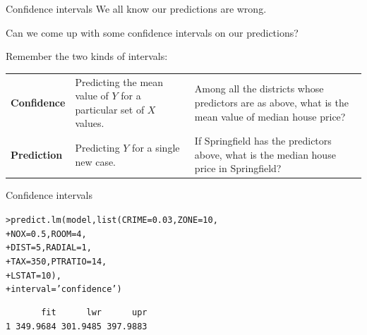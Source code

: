 \documentclass{beamer}\usepackage[]{graphicx}\usepackage[]{color}
\makeatletter
\newcommand{\hlnum}[1]{\textcolor[rgb]{0.824,0.412,0.118}{#1}}%
\newcommand{\hlstr}[1]{\textcolor[rgb]{1,0.894,0.71}{#1}}%
\newcommand{\hlstd}[1]{\textcolor[rgb]{1,0.894,0.769}{#1}}%
\newcommand{\hlkwc}[1]{\textcolor[rgb]{0.78,0.941,0.545}{#1}}%
\newcommand{\hlkwd}[1]{\textcolor[rgb]{1,0.78,0.769}{#1}}%
\newenvironment{kframe}{%
 \def\at@end@of@kframe{}%
 \ifinner\ifhmode%
  \def\at@end@of@kframe{\end{minipage}}%
  \begin{minipage}{\columnwidth}%
 \fi\fi%
 \def\FrameCommand##1{\hskip\@totalleftmargin \hskip-\fboxsep
 \colorbox{shadecolor}{##1}\hskip-\fboxsep
     \hskip-\linewidth \hskip-\@totalleftmargin \hskip\columnwidth}%
 \MakeFramed {\advance\hsize-\width
   \@totalleftmargin\z@ \linewidth\hsize
   \@setminipage}}%
 {\par\unskip\endMakeFramed%
 \at@end@of@kframe}
\newenvironment{knitrout}{}{} %
\makeatother
\begin{document}
\begin{darkframes}
    
    
    \begin{frame}[fragile]{Confidence intervals}
    \fontsize{9}{9}\selectfont
      We all know our predictions are wrong. 
      
      Can we come up with some confidence intervals on our predictions? \pause
      \bigskip
      
      Remember the two kinds of intervals:
      \bigskip

      \begin{tabular}{lp{1in}p{2in}}
        \textbf{Confidence} & Predicting the mean value of $Y$ for a particular  set of $X$ values. & Among all the districts whose predictors are as above, what is the mean value of median house price?  \\
        \textbf{Prediction} & Predicting $Y$ for a single new case. & If Springfield has the predictors above, what is the median house price in Springfield?\\
      \end{tabular}
    
    
    \end{frame}
        
      
    
    \begin{frame}[fragile]{Confidence intervals}
      \fontsize{9}{9}\selectfont
\begin{knitrout}
\begin{kframe}
\begin{alltt}
\hlstd{> }\hlkwd{predict.lm}\hlstd{(model,} \hlkwd{list}\hlstd{(}\hlkwc{CRIME}\hlstd{=}\hlnum{0.03}\hlstd{,} \hlkwc{ZONE}\hlstd{=}\hlnum{10}\hlstd{,}
\hlstd{+ }                       \hlkwc{NOX}\hlstd{=}\hlnum{0.5}\hlstd{,} \hlkwc{ROOM}\hlstd{=}\hlnum{4}\hlstd{,}
\hlstd{+ }                       \hlkwc{DIST}\hlstd{=}\hlnum{5}\hlstd{,}  \hlkwc{RADIAL}\hlstd{=}\hlnum{1}\hlstd{,}
\hlstd{+ }                       \hlkwc{TAX}\hlstd{=}\hlnum{350}\hlstd{,} \hlkwc{PTRATIO}\hlstd{=}\hlnum{14}\hlstd{,}
\hlstd{+ }                       \hlkwc{LSTAT}\hlstd{=}\hlnum{10}\hlstd{),}
\hlstd{+ }                       \hlkwc{interval} \hlstd{=} \hlstr{'confidence'}\hlstd{)}
\end{alltt}
\begin{verbatim}
       fit      lwr      upr
1 349.9684 301.9485 397.9883
\end{verbatim}
\end{kframe}
\end{knitrout}
     \lc
     \end{frame}
     

\end{darkframes}
\end{document}
